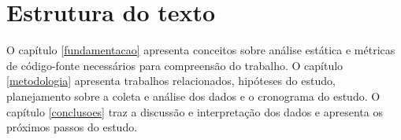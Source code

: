 \section{Estrutura do texto} 

O capítulo \ref{fundamentacao} apresenta conceitos sobre análise estática e
métricas de código-fonte necessários para compreensão do trabalho. O capítulo
\ref{metodologia} apresenta trabalhos relacionados, hipóteses do estudo,
planejamento sobre a coleta e análise dos dados
e o cronograma do estudo. O capítulo \ref{conclusoes} traz a
discussão e interpretação dos dados e apresenta os próximos passos do estudo.
